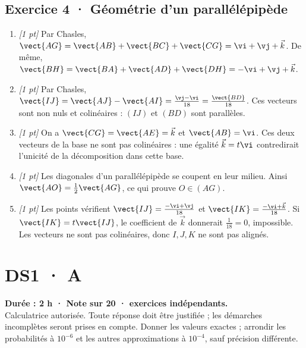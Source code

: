 \subsection*{Exercice 4 · Géométrie d'un parallélépipède}\begin{enumerate}

\item \textit{[1 pt]} Par Chasles, $\vect{AG}=\vect{AB}+\vect{BC}+\vect{CG}=\vi +\vj +\vec k$. De même, $\vect{BH}=\vect{BA}+\vect{AD}+\vect{DH}=-\vi +\vj +\vec k$.

\item \textit{[1 pt]} Par Chasles, $\vect{IJ}=\vect{AJ}-\vect{AI}=\frac{\vj -\vi }{18}=\frac{\vect{BD}}{18}$. Ces vecteurs sont non nuls et colinéaires : $(IJ)$ et $(BD)$ sont parallèles.

\item \textit{[1 pt]} On a $\vect{CG}=\vect{AE}=\vec k$ et $\vect{AB}=\vi $. Ces deux vecteurs de la base ne sont pas colinéaires : une égalité $\vec k=t\vi $ contredirait l'unicité de la décomposition dans cette base.

\item \textit{[1 pt]} Les diagonales d'un parallélépipède se coupent en leur milieu. Ainsi $\vect{AO}=\frac12\vect{AG}$, ce qui prouve $O\in(AG)$.

\item \textit{[1 pt]} Les points vérifient $\vect{IJ}=\frac{-\vi +\vj }{18}$ et $\vect{IK}=\frac{-\vi +\vec k}{18}$. Si $\vect{IK}=t\vect{IJ}$, le coefficient de $\vec k$ donnerait $\frac{1}{18}=0$, impossible. Les vecteurs ne sont pas colinéaires, donc $I,J,K$ ne sont pas alignés.

\end{enumerate}

\fi

\ifmxteacher

\mxnewpage{}\label{sujet:1-3}

\section*{DS1 · A}


\textbf{Durée : 2 h · Note sur 20 ·  exercices indépendants.}\\Calculatrice autorisée. Toute réponse doit être justifiée ; les démarches incomplètes seront prises en compte. Donner les valeurs exactes ; arrondir les probabilités à $10^{-6}$ et les autres approximations à $10^{-4}$, sauf précision différente.

